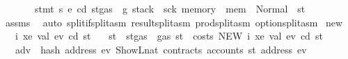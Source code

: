 \begin{isabellebody}
\ \ \ \ \ \ \ {\isachardoublequoteopen}stmt\ s\ e{\isacharprime}{\kern0pt}\ cd{\isacharprime}{\kern0pt}\ {\isacharparenleft}{\kern0pt}st{\isasymlparr}gas\ {\isacharcolon}{\kern0pt}{\isacharequal}{\kern0pt}\ g{\isacharcomma}{\kern0pt}\ stack\ {\isacharcolon}{\kern0pt}{\isacharequal}{\kern0pt}\ sck{\isacharprime}{\kern0pt}{\isacharcomma}{\kern0pt}\ memory\ {\isacharcolon}{\kern0pt}{\isacharequal}{\kern0pt}\ mem{\isacharprime}{\kern0pt}{\isasymrparr}{\isacharparenright}{\kern0pt}\ {\isacharequal}{\kern0pt}\ Normal\ {\isacharparenleft}{\kern0pt}{\isacharparenleft}{\kern0pt}{\isacharparenright}{\kern0pt}{\isacharcomma}{\kern0pt}\ st{\isacharprime}{\kern0pt}{\isacharparenright}{\kern0pt}{\isachardoublequoteclose}\isanewline
%
\isadelimproof
\ \ %
\endisadelimproof
%
\isatagproof
{}\isamarkupfalse%
\ assms\ \isamarkupfalse%
\ {\isacharparenleft}{\kern0pt}auto\ split{\isacharcolon}{\kern0pt}if{\isacharunderscore}{\kern0pt}split{\isacharunderscore}{\kern0pt}asm\ result{\isachardot}{\kern0pt}split{\isacharunderscore}{\kern0pt}asm\ prod{\isachardot}{\kern0pt}split{\isacharunderscore}{\kern0pt}asm\ option{\isachardot}{\kern0pt}split{\isacharunderscore}{\kern0pt}asm{\isacharparenright}{\kern0pt}%
\endisatagproof
{\isafoldproof}%
%
\isadelimproof
\isanewline
%
\endisadelimproof
\isanewline
{}\isamarkupfalse%
\ new{\isacharcolon}{\kern0pt}\isanewline
\ \ \ i\ xe\ val\ ev\ cd\ st\isanewline
\ \ \ {\isachardoublequoteopen}st{}\ {\isasymequiv}\ st{\isasymlparr}gas\ {\isacharcolon}{\kern0pt}{\isacharequal}{\kern0pt}\ gas\ st\ {\isacharminus}{\kern0pt}\ costs\ {\isacharparenleft}{\kern0pt}NEW\ i\ xe\ val{\isacharparenright}{\kern0pt}\ ev\ cd\ st{\isasymrparr}{\isachardoublequoteclose}\isanewline
\ \ \ {\isachardoublequoteopen}adv{}\ {\isasymequiv}\ hash\ {\isacharparenleft}{\kern0pt}address\ ev{\isacharparenright}{\kern0pt}\ {\isacharparenleft}{\kern0pt}ShowL\isactrlsub n\isactrlsub a\isactrlsub t\ {\isacharparenleft}{\kern0pt}contracts\ {\isacharparenleft}{\kern0pt}accounts\ st{}\ {\isacharparenleft}{\kern0pt}address\ ev{\isacharparenright}{\kern0pt}{\isacharparenright}{\kern0pt}{\isacharparenright}{\kern0pt}{\isacharparenright}{\kern0pt}{\isachardoublequoteclose}\isanewline

\end{isabellebody}
